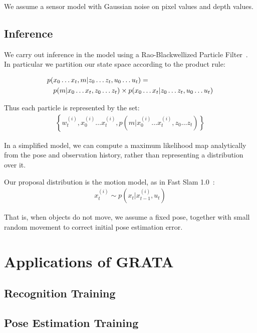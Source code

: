 We assume a sensor model with Gaussian noise on pixel values and depth
values.

\subsection{Inference}

We carry out inference in the model using a Rao-Blackwellized Particle
Filter~\citep{durrant06}.  In particular we partition our state space
according to the product rule:

\begin{align}
p(&x_0 \dots x_t, m | z_0 \dots z_t, u_0 \dots u_t) = \notag\\
& p(m | x_0 \dots x_t, z_0 \dots z_t) \times p(x_0 \dots x_t | z_0 \dots z_t, u_0 \dots u_t)
\end{align}

Thus each particle is represented by the set:
\begin{align}
\left\{ w_t^{(i)}, x_0^{(i)} \dots x_t^{(i)}, p(m | x_0^{(i)} \dots x_t^{(i)}, z_0 \dots z_t)\right\}
\end{align}

In a simplified model, we can compute a maximum likelihood map
analytically from the pose and observation history, rather than
representing a distribution over it.

Our proposal distribution is the motion model, as in Fast Slam
1.0~\citep{montemerlo02}:
\begin{align}
x_t^{(i)} \sim  p(x_t | x_{t-1}^{(i)}, u_t)
\end{align}

That is, when objects do not move, we assume a fixed pose, together
with small random movement to correct initial pose estimation error.



\section{Applications of GRATA}

\subsection{Recognition Training}

\subsection{Pose Estimation Training}

